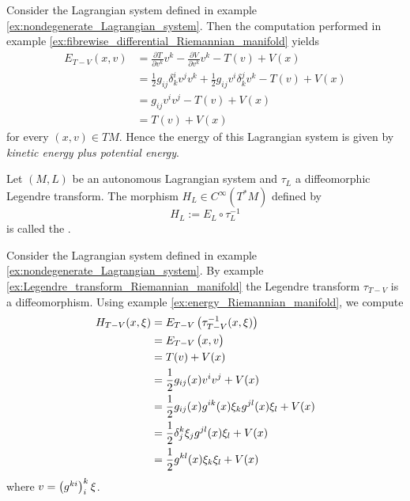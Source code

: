 \begin{example}
	\label{ex:energy_Riemannian_manifold}
	Consider the Lagrangian system defined in example \ref{ex:nondegenerate_Lagrangian_system}. Then the computation performed in example \ref{ex:fibrewise_differential_Riemannian_manifold} yields
	\begin{align*}
		E_{T - V}(x,v) &= \frac{\partial T}{\partial v^k}v^k - \frac{\partial V}{\partial v^k}v^k - T(v) + V(x)\\
		&= \frac{1}{2}g_{ij}\delta^i_k v^jv^k + \frac{1}{2}g_{ij}v^i \delta^j_k v^k - T(v) + V(x)\\
		&= g_{ij}v^i v^j - T(v) + V(x)\\
		&= T(v) + V(x)
	\end{align*}
	\noindent for every $(x,v) \in TM$. Hence the energy of this Lagrangian system is given by \emph{kinetic energy plus potential energy}.
\end{example}

\begin{definition}
	\label{def:Hamiltonian_function}
	Let $(M,L)$ be an autonomous Lagrangian system and $\tau_L$ a diffeomorphic Legendre transform. The morphism $H_L \in C^\infty(T^*M)$ defined by
	\begin{equation*}
		H_L := E_L \circ \tau_L^{-1}
	\end{equation*}
	\noindent is called the .
\end{definition}

\begin{example}
	Consider the Lagrangian system defined in example \ref{ex:nondegenerate_Lagrangian_system}. By example \ref{ex:Legendre_transform_Riemannian_manifold} the Legendre transform $\tau_{T - V}$ is a diffeomorphism. Using example \ref{ex:energy_Riemannian_manifold}, we compute
	\begin{align*}
		H_{T - V}(x,\xi) &= E_{T - V}\del[1]{\tau^{-1}_{T - V}(x,\xi)}\\
		&= E_{T - V}\del[1]{x,v}\\
		&= T(v) + V(x)\\
		&= \frac{1}{2}g_{ij}(x)v^i v^j + V(x)\\
		&= \frac{1}{2}g_{ij}(x)g^{ik}(x)\xi_k g^{jl}(x)\xi_l + V(x)\\
		&= \frac{1}{2}\delta^k_j\xi_j g^{jl}(x)\xi_l + V(x)\\
		&= \frac{1}{2}g^{kl}(x)\xi_k\xi_l + V(x)
	\end{align*}
	\noindent where $v = \del[1]{g^{ki}}^k_i \xi$.
\end{example}


